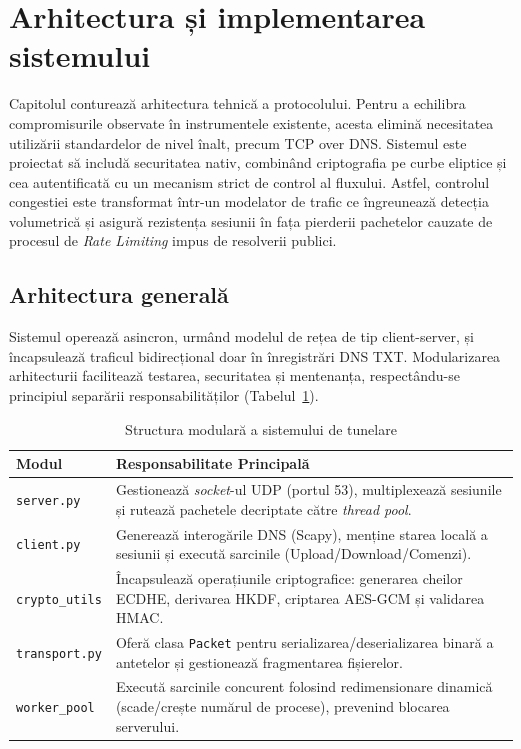 \section{Arhitectura și implementarea sistemului}
Capitolul conturează arhitectura tehnică a protocolului. Pentru a echilibra compromisurile observate în instrumentele existente, acesta elimină necesitatea utilizării standardelor de nivel înalt, precum TCP over DNS. Sistemul este proiectat să includă securitatea nativ, combinând criptografia pe curbe eliptice și cea autentificată cu un mecanism strict de control al fluxului. Astfel, controlul congestiei este transformat într-un modelator de trafic ce îngreunează detecția volumetrică și asigură rezistența sesiunii în fața pierderii pachetelor cauzate de procesul de \textit{Rate Limiting} impus de resolverii publici. 

\subsection{Arhitectura generală}
Sistemul operează asincron, urmând modelul de rețea de tip client-server, și încapsulează traficul bidirecțional doar în înregistrări DNS TXT. Modularizarea arhitecturii facilitează testarea, securitatea și mentenanța, respectându-se principiul separării responsabilităților (Tabelul~\ref{tab:module_arhitectura}).

\begin{table}[htbp]
    \centering
    \small
    \renewcommand{\arraystretch}{1.1}
    \begin{tabular}{|l|>{\raggedright\arraybackslash}p{11.5cm}|}
        \hline
        \textbf{Modul} & \textbf{Responsabilitate Principală} \\
        \hline
        \texttt{server.py} & Gestionează \textit{socket}-ul UDP (portul 53), multiplexează sesiunile și rutează pachetele decriptate către \textit{thread pool}. \\
        \hline
        \texttt{client.py} & Generează interogările DNS (Scapy), menține starea locală a sesiunii și execută sarcinile (Upload/Download/Comenzi). \\
        \hline
        \texttt{crypto\_utils} & Încapsulează operațiunile criptografice: generarea cheilor ECDHE, derivarea HKDF, criptarea AES-GCM și validarea HMAC. \\
        \hline
        \texttt{transport.py} & Oferă clasa \texttt{Packet} pentru serializarea/deserializarea binară a antetelor și gestionează fragmentarea fișierelor. \\
        \hline
        \texttt{worker\_pool} & Execută sarcinile concurent folosind redimensionare dinamică (scade/crește numărul de procese), prevenind blocarea serverului. \\
        \hline
    \end{tabular}
    \caption{Structura modulară a sistemului de tunelare}
    \label{tab:module_arhitectura}
\end{table}


